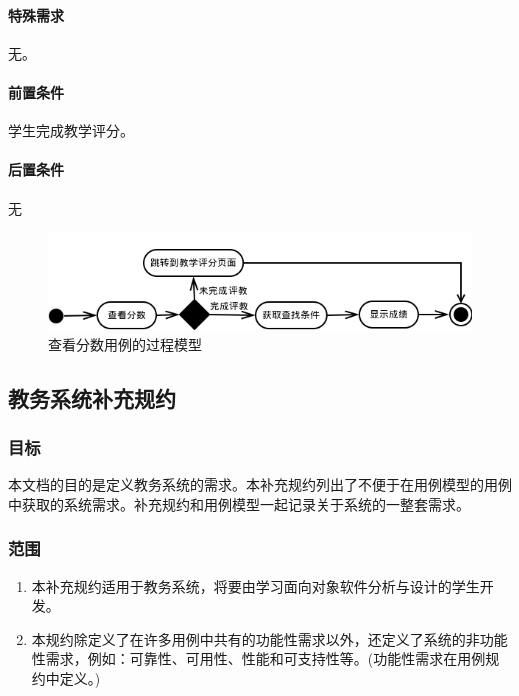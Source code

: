 \paragraph{特殊需求}
  
无。
  
\paragraph{前置条件}
  
学生完成教学评分。
  
\paragraph{后置条件}
  
无

\begin{figure}[H]
  \centering
  \includegraphics[scale=0.7]{img/jwxt_viewscore.png}
  \caption{查看分数用例的过程模型}
\end{figure}

\subsection{教务系统补充规约}

\subsubsection{目标}
本文档的目的是定义教务系统的需求。本补充规约列出了不便于在用例模型的用例中获取的系统需求。补充规约和用例模型一起记录关于系统的一整套需求。
  
\subsubsection{范围}
  
  \begin{enumerate}
    \item 本补充规约适用于教务系统，将要由学习面向对象软件分析与设计的学生开发。
    \item 本规约除定义了在许多用例中共有的功能性需求以外，还定义了系统的非功能性需求，例如：可靠性、可用性、性能和可支持性等。(功能性需求在用例规约中定义。)
  \end{enumerate}
  
